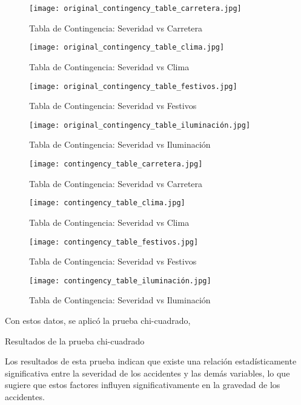 \documentclass{book}
\begin{document}
\begin{figure}[htbp]
\centering
\texttt{[image: original\_contingency\_table\_carretera.jpg]}
\caption{\label{fig:occarretera}Tabla de Contingencia: Severidad vs Carretera}
\end{figure}
\begin{figure}[htbp]
\centering
\texttt{[image: original\_contingency\_table\_clima.jpg]}
\caption{\label{fig:occlima}Tabla de Contingencia: Severidad vs Clima}
\end{figure}
\begin{figure}[htbp]
\centering
\texttt{[image: original\_contingency\_table\_festivos.jpg]}
\caption{\label{fig:ocfestivos}Tabla de Contingencia: Severidad vs Festivos}
\end{figure}
\begin{figure}[htbp]
\centering
\texttt{[image: original\_contingency\_table\_iluminación.jpg]}
\caption{\label{fig:ociluminación}Tabla de Contingencia: Severidad vs Iluminación}
\end{figure}
\begin{figure}[htbp]
\centering
\texttt{[image: contingency\_table\_carretera.jpg]}
\caption{\label{fig:ccarretera}Tabla de Contingencia: Severidad vs Carretera}
\end{figure}
\begin{figure}[htbp]
\centering
\texttt{[image: contingency\_table\_clima.jpg]}
\caption{\label{fig:cclima}Tabla de Contingencia: Severidad vs Clima}
\end{figure}
\begin{figure}[htbp]
\centering
\texttt{[image: contingency\_table\_festivos.jpg]}
\caption{\label{fig:cfestivos}Tabla de Contingencia: Severidad vs Festivos}
\end{figure}
\begin{figure}[htbp]
\centering
\texttt{[image: contingency\_table\_iluminación.jpg]}
\caption{\label{fig:ciluminación}Tabla de Contingencia: Severidad vs Iluminación}
\end{figure}

Con estos datos, se aplicó la prueba chi-cuadrado,

\begin{table}[H]
\centering

\caption{Resultados de la prueba chi-cuadrado}
\end{table}

Los resultados de esta prueba indican que existe una relación estadísticamente significativa entre la severidad de los accidentes y las demás variables, lo que sugiere que estos factores influyen significativamente en la gravedad de los accidentes.
\end{document}
